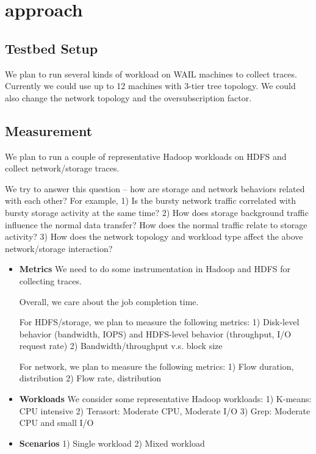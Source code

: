 \section{approach}
\label{sec:approach}

\subsection {\bf Testbed Setup}
We plan to run several kinds of workload on WAIL machines to collect traces. Currently we could use up to 12 machines with 3-tier tree topology. We could also change the network topology and the oversubscription factor. 

\subsection {\bf Measurement}
We plan to run a couple of representative Hadoop workloads on HDFS and collect network/storage traces.

We try to answer this question -- how are storage and network behaviors related with each other? For example,
1) Is the bursty network traffic correlated with bursty storage activity at the same time? 
2) How does storage background traffic influence the normal data transfer? How does the normal traffic relate to storage activity?
3) How does the network topology and workload type affect the above network/storage interaction?

\begin{itemize}
	\item {\bf Metrics}
We need to do some instrumentation in Hadoop and HDFS for collecting traces.

Overall, we care about the job completion time. 

For HDFS/storage, we plan to measure the following metrics:
1) Disk-level behavior (bandwidth, IOPS) and HDFS-level behavior (throughput, I/O request rate)
2) Bandwidth/throughput v.s. block size

For network, we plan to measure the following metrics:
1) Flow duration, distribution
2) Flow rate, distribution

	\item {\bf Workloads}
We consider some representative Hadoop workloads:
1) K-means: CPU intensive
2) Terasort: Moderate CPU, Moderate I/O
3) Grep: Moderate CPU and small I/O
	
	\item {\bf Scenarios}
1) Single workload
2) Mixed workload

\end{itemize}

